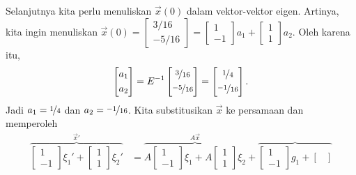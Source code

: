 \begin{example}
Selanjutnya kita perlu menuliskan $\vec{x}(0)$ dalam vektor-vektor eigen.
Artinya, kita ingin menuliskan $\vec{x}(0) = 
\left[ \begin{smallmatrix}
3/16 \\
-5/16
\end{smallmatrix} \right] = 
\left[ \begin{smallmatrix}
1 \\
-1
\end{smallmatrix} \right] a_1 +
\left[ \begin{smallmatrix}
1 \\
1
\end{smallmatrix} \right] a_2$.  Oleh karena itu,
\begin{equation*}
\begin{bmatrix}
a_1 \\
\noalign{\smallskip}
a_2
\end{bmatrix} = 
E^{-1}
\begin{bmatrix}
\nicefrac{3}{16} \\
\noalign{\smallskip}
\nicefrac{-5}{16}
\end{bmatrix}
=
\begin{bmatrix}
\nicefrac{1}{4} \\
\noalign{\smallskip}
\nicefrac{-1}{16}
\end{bmatrix} .
\end{equation*}
Jadi $a_1 = \nicefrac{1}{4}$ dan $a_2 = \nicefrac{-1}{16}$.
Kita substitusikan $\vec{x}$ ke persamaan dan memperoleh
\begin{equation*}
\begin{split}
\overbrace{
\begin{bmatrix}
1 \\
-1
\end{bmatrix} \xi_1' +
\begin{bmatrix}
1 \\
1
\end{bmatrix} \xi_2'
}^{\vec{x}'}
& =
\overbrace{
A
\begin{bmatrix}
1 \\
-1
\end{bmatrix} \xi_1 +
A
\begin{bmatrix}
1 \\
1
\end{bmatrix} \xi_2
}^{A\vec{x}}
+
\overbrace{
\begin{bmatrix}
1 \\
-1
\end{bmatrix} g_1 +
\begin{bmatrix}

\end{bmatrix}}
\end{split}
\end{equation*}
\end{example}
